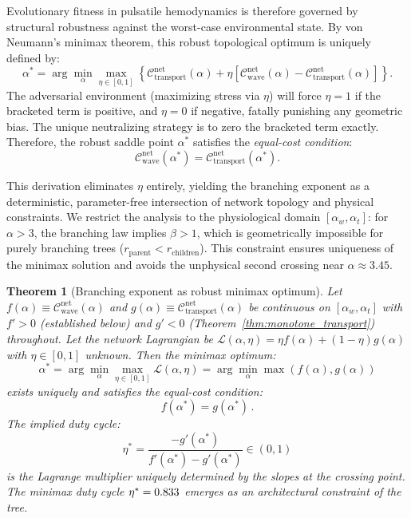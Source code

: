 \documentclass[11pt,a4paper]{article}
\newtheorem{theorem}{Theorem}
\theoremstyle{remark}
\begin{document}
Evolutionary fitness in pulsatile hemodynamics is therefore governed by
structural robustness against the worst-case environmental state. By von
Neumann's minimax theorem, this robust topological optimum is uniquely defined
by:
\begin{equation}
  \alpha^* = \arg \min_{\alpha} \max_{\eta \in [0,1]} \left\{ \mathcal{C}_{\mathrm{transport}}^{\mathrm{net}}(\alpha) + \eta \left[ \mathcal{C}_{\mathrm{wave}}^{\mathrm{net}}(\alpha) - \mathcal{C}_{\mathrm{transport}}^{\mathrm{net}}(\alpha) \right] \right\}.
\end{equation}
The adversarial environment (maximizing stress via $\eta$) will force $\eta=1$
if the bracketed term is positive, and $\eta=0$ if negative, fatally punishing
any geometric bias. The unique neutralizing strategy is to zero the bracketed
term exactly. Therefore, the robust saddle point $\alpha^*$ satisfies the
\emph{equal-cost condition}:
\begin{equation}
  \mathcal{C}_{\mathrm{wave}}^{\mathrm{net}}(\alpha^*) = \mathcal{C}_{\mathrm{transport}}^{\mathrm{net}}(\alpha^*).
\end{equation}

This derivation eliminates $\eta$ entirely, yielding the branching exponent as a
deterministic, parameter-free intersection of network topology and physical
constraints.
We restrict the analysis to the physiological domain $[\alpha_w, \alpha_t]$: for
$\alpha > 3$, the branching law implies $\beta > 1$, which is geometrically
impossible for purely branching trees ($r_{\mathrm{parent}} <
r_{\mathrm{children}}$). This constraint ensures uniqueness of the minimax
solution and avoids the unphysical second crossing near $\alpha \approx 3.45$.

\begin{theorem}[Branching exponent as robust minimax optimum]
\label{thm:minimax}
Let $f(\alpha) \equiv \mathcal{C}^{\mathrm{net}}_{\mathrm{wave}}(\alpha)$ and
$g(\alpha) \equiv \mathcal{C}^{\mathrm{net}}_{\mathrm{transport}}(\alpha)$ be
continuous on $[\alpha_w, \alpha_t]$ with $f' > 0$ (established below) and $g' <
0$ (Theorem~\ref{thm:monotone_transport}) throughout. Let the network Lagrangian
be $\mathcal{L}(\alpha, \eta) = \eta f(\alpha) + (1-\eta)g(\alpha)$ with $\eta
\in [0,1]$ unknown. Then the minimax optimum:
\[
\alpha^* = \arg\min_{\alpha} \max_{\eta \in [0,1]} \mathcal{L}(\alpha, \eta) = \arg\min_{\alpha} \max(f(\alpha), g(\alpha))
\]
exists uniquely and satisfies the equal-cost condition:
\begin{equation}
f(\alpha^*) = g(\alpha^*)\,.
\label{eq:minimax}
\end{equation}
The implied duty cycle:
\[
\eta^* = \frac{-g'(\alpha^*)}{f'(\alpha^*) - g'(\alpha^*)} \in (0,1)
\]
is the Lagrange multiplier uniquely determined by the slopes at the crossing
point. The minimax duty cycle $\eta^* = 0.833$ emerges as an architectural
constraint of the tree.
\end{theorem}
\end{document}

